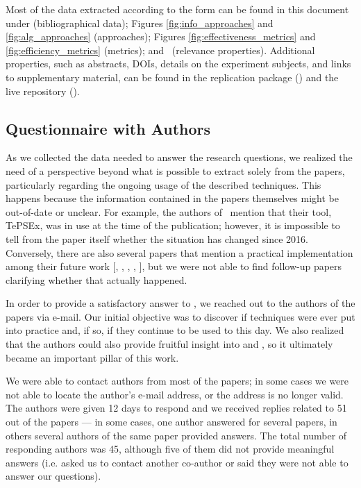 Most of the data extracted according to the form can be found in this document under  (bibliographical data); Figures \ref{fig:info_approaches} and \ref{fig:alg_approaches} (approaches); Figures \ref{fig:effectiveness_metrics} and \ref{fig:efficiency_metrics} (metrics); and~ (\rea relevance properties).
Additional properties, such as abstracts, DOIs, details on the experiment subjects, and links to supplementary material, can be found in the replication package () and the live repository ().



\subsection{Questionnaire with Authors}
\label{subsec:questionnaires}

As we collected the data needed to answer the research questions, we realized the need of a perspective beyond what is possible to extract solely from the papers, particularly regarding the ongoing usage of the described techniques.
This happens because the information contained in the papers themselves might be out-of-date or unclear.
For example, the authors of~ mention that their tool, TePSEx, was in use at the time of the publication; however, it is impossible to tell from the paper itself whether the situation has changed since 2016.
Conversely, there are also several papers that mention a practical implementation among their future work [, 
, 
, 
, 
], but we were not able to find follow-up papers clarifying whether that actually happened.

In order to provide a satisfactory answer to , we reached out to the authors of the papers via e-mail.
Our initial objective was to discover if techniques were ever put into practice and, if so, if they continue to be used to this day.
We also realized that the authors could also provide fruitful insight into  and , so it ultimately became an important pillar of this work.

We were able to contact authors from most of the papers; in some cases we were not able to locate the author's e-mail address, or the address is no longer valid.
The authors were given 12 days to respond and we received replies related to 51 out of the \numpapers papers --- in some cases, one author answered for several papers, in others several authors of the same paper provided answers.
The total number of responding authors was 45, although five of them did not provide meaningful answers (i.e. asked us to contact another co-author or said they were not able to answer our questions).

